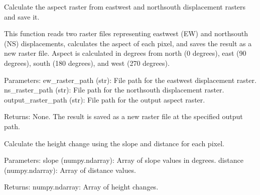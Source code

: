 \documentclass[letterpaper,10pt,english]{sphinxmanual}
\begin{document}
\begin{fulllineitems}
\label{\detokenize{akhdefo_functions:akhdefo_functions.Akhdefo_Tools.calculate_and_save_aspect_raster}}
\pysigstartsignatures
{}
\pysigstopsignatures
\sphinxAtStartPar
Calculate the aspect raster from east\sphinxhyphen{}west and north\sphinxhyphen{}south displacement rasters and save it.

\sphinxAtStartPar
This function reads two raster files representing east\sphinxhyphen{}west (EW) and north\sphinxhyphen{}south (NS) 
displacements, calculates the aspect of each pixel, and saves the result as a new raster file.
Aspect is calculated in degrees from north (0 degrees), east (90 degrees), south (180 degrees),
and west (270 degrees).

\sphinxAtStartPar
Parameters:
\sphinxhyphen{} ew\_raster\_path (str): File path for the east\sphinxhyphen{}west displacement raster.
\sphinxhyphen{} ns\_raster\_path (str): File path for the north\sphinxhyphen{}south displacement raster.
\sphinxhyphen{} output\_raster\_path (str): File path for the output aspect raster.

\sphinxAtStartPar
Returns:
None. The result is saved as a new raster file at the specified output path.

\end{fulllineitems}


\begin{fulllineitems}
\label{\detokenize{akhdefo_functions:akhdefo_functions.Akhdefo_Tools.calculate_height_change}}
\pysigstartsignatures
{}
\pysigstopsignatures
\sphinxAtStartPar
Calculate the height change using the slope and distance for each pixel.

\sphinxAtStartPar
Parameters:
slope (numpy.ndarray): Array of slope values in degrees.
distance (numpy.ndarray): Array of distance values.

\sphinxAtStartPar
Returns:
numpy.ndarray: Array of height changes.

\end{fulllineitems}
\end{document}
